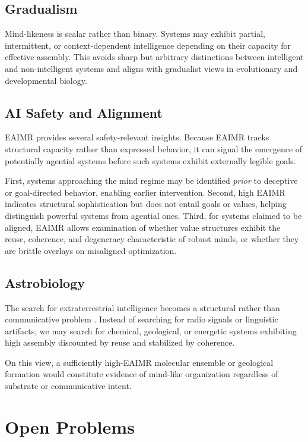 \documentclass[11pt,letterpaper]{article}
\begin{document}
\subsection{Gradualism}

Mind-likeness is scalar rather than binary. Systems may exhibit partial, intermittent, or context-dependent intelligence depending on their capacity for effective assembly. This avoids sharp but arbitrary distinctions between intelligent and non-intelligent systems and aligns with gradualist views in evolutionary and developmental biology.

\subsection{AI Safety and Alignment}

EAIMR provides several safety-relevant insights. Because EAIMR tracks structural capacity rather than expressed behavior, it can signal the emergence of potentially agential systems before such systems exhibit externally legible goals.

First, systems approaching the mind regime may be identified \emph{prior} to deceptive or goal-directed behavior, enabling earlier intervention. Second, high EAIMR indicates structural sophistication but does not entail goals or values, helping distinguish powerful systems from agential ones. Third, for systems claimed to be aligned, EAIMR allows examination of whether value structures exhibit the reuse, coherence, and degeneracy characteristic of robust minds, or whether they are brittle overlays on misaligned optimization.

\subsection{Astrobiology}

The search for extraterrestrial intelligence becomes a structural rather than communicative problem \parencite{walker2022}. Instead of searching for radio signals or linguistic artifacts, we may search for chemical, geological, or energetic systems exhibiting high assembly discounted by reuse and stabilized by coherence.

On this view, a sufficiently high-EAIMR molecular ensemble or geological formation would constitute evidence of mind-like organization regardless of substrate or communicative intent.

\section{Open Problems}
\end{document}

